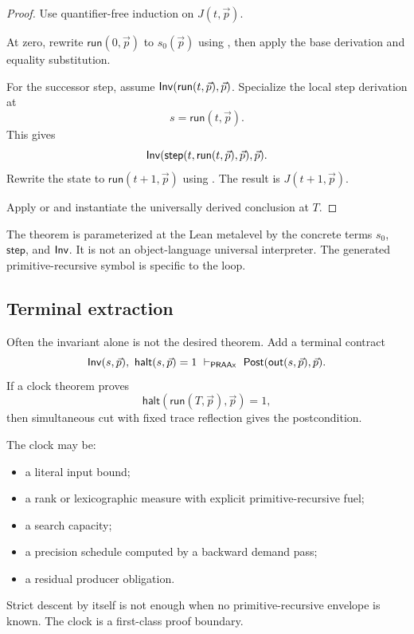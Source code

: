 \begin{proof}
Use quantifier-free induction on \(J(t,\vec p)\).

At zero, rewrite \(\mathsf{run}(0,\vec p)\) to \(s_0(\vec p)\) using
, then apply the base derivation and equality substitution.

For the successor step, assume
\(\mathsf{Inv}(\mathsf{run}(t,\vec p),\vec p)\).  Specialize the local step derivation
at
\[
     s=\mathsf{run}(t,\vec p).
\]
This gives
\[
 \mathsf{Inv}(\mathsf{step}(t,\mathsf{run}(t,\vec p),\vec p),\vec p).
\]
Rewrite the state to \(\mathsf{run}(t+1,\vec p)\) using
.  The result is \(J(t+1,\vec p)\).

Apply  or  and instantiate the universally
derived conclusion at \(T\).
\end{proof}

\begin{remark}
The theorem is parameterized at the Lean metalevel by the concrete terms
\(s_0\), \(\mathsf{step}\), and \(\mathsf{Inv}\).  It is not an object-language
universal interpreter.  The generated primitive-recursive symbol is specific
to the loop.
\end{remark}

\subsection{Terminal extraction}

Often the invariant alone is not the desired theorem.  Add a terminal
contract
\[
  \Inv(s,\vec p),\ \mathsf{halt}(s,\vec p)=1
  \ \vdash_{\PRAAx}\
  \Post(\mathsf{out}(s,\vec p),\vec p).
\]
If a clock theorem proves
\[
   \mathsf{halt}(\mathsf{run}(T,\vec p),\vec p)=1,
\]
then simultaneous cut with fixed trace reflection gives the postcondition.

The clock may be:
\begin{itemize}
\item a literal input bound;
\item a rank or lexicographic measure with explicit primitive-recursive fuel;
\item a search capacity;
\item a precision schedule computed by a backward demand pass;
\item a residual producer obligation.
\end{itemize}
Strict descent by itself is not enough when no primitive-recursive envelope is
known.  The clock is a first-class proof boundary.

